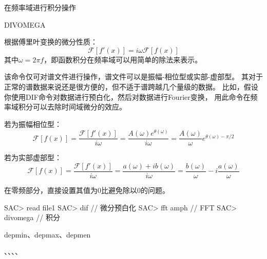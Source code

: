 \label{cmd:divomega}

在频率域进行积分操作

\begin{SACSTX}
DIVOMEGA
\end{SACSTX}

根据傅里叶变换的微分性质：
\[
\mathcal{F}[f'(x)]= i \omega \mathcal{F}[f(x)]
\]
其中$\omega = 2 \pi f $，即函数积分在频率域可以用简单的除法来表示。

该命令仅可对谱文件进行操作，谱文件可以是振幅-相位型或实部-虚部型。
其对于正常的谱数据来说还是很方便的，但不适于谱跨越几个量级的数据。
比如，假设你使用DIF命令对数据进行预白化，然后对数据进行Fourier变换，
用此命令在频率域积分可以去除时间域微分的效应。

若为振幅相位型：
\[
\mathcal{F}[f(x)] = \frac{\mathcal{F}[f'(x)]}{i \omega}
                  = \frac{A(\omega)e^{\theta(\omega)}}{i \omega}
                  = \frac{A(\omega)}{\omega}e^{\theta(\omega)-\pi/2}
\]

若为实部虚部型：
\[
\mathcal{F}[f(x)] = \frac{\mathcal{F}[f'(x)]}{i \omega}
                  = \frac{a(\omega)+ib(\omega)}{i \omega}
                  = \frac{b(\omega)}{\omega}-i\frac{a(\omega)}{\omega}
\]

在零频部分，直接设置其值为0比避免除以0的问题。

\begin{SACCode}
SAC> read file1
SAC> dif                // 微分预白化
SAC> fft amph           // FFT
SAC> divomega           // 积分
\end{SACCode}

depmin、depmax、depmen

、、、、
